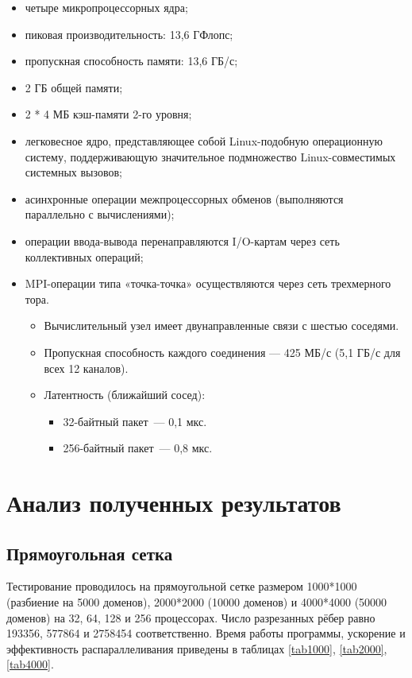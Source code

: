 \documentclass[oneside,final,14pt]{extreport}
\begin{document}
\begin{itemize}
    \item четыре микропроцессорных ядра;
    \item пиковая производительность: 13,6 ГФлопс;
    \item пропускная способность памяти: 13,6 ГБ/с;
    \item 2 ГБ общей памяти;
    \item 2 * 4 МБ кэш-памяти 2-го уровня;
    \item легковесное ядро, представляющее собой Linux-подобную операционную систему,
        поддерживающую значительное подмножество Linux-совместимых системных вызовов;
    \item асинхронные операции межпроцессорных обменов (выполняются параллельно с вычислениями);
    \item операции ввода-вывода перенаправляются I/O-картам через сеть коллективных операций;
    \item MPI-операции типа «точка-точка» осуществляются через сеть трехмерного тора.
        \begin{itemize}
            \item Вычислительный узел имеет двунаправленные связи с шестью соседями.
            \item Пропускная способность каждого соединения — 425 МБ/с (5,1 ГБ/с для всех 12
        каналов).
            \item Латентность (ближайший сосед):
                \begin{itemize}
                    \item 32-байтный пакет~--- 0,1 мкс.
                    \item 256-байтный пакет~--- 0,8 мкс.
                \end{itemize}
        \end{itemize}
\end{itemize}


\chapter*{Анализ полученных результатов}

\section*{Прямоугольная сетка}

Тестирование проводилось на прямоугольной сетке размером
1000*1000 (разбиение на 5000 доменов), 2000*2000 (10000 доменов) и
4000*4000 (50000 доменов) на 32, 64, 128 и 256 процессорах. Число разрезанных
рёбер равно 193356, 577864 и
2758454 соответственно. Время работы программы, ускорение и эффективность
распараллеливания приведены в таблицах \ref{tab1000}, \ref{tab2000},
\ref{tab4000}.
\end{document}
